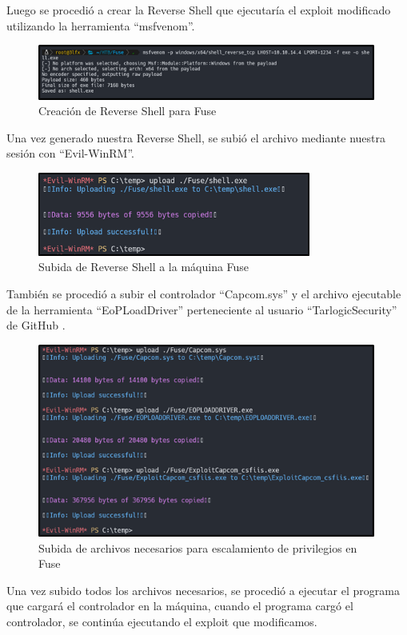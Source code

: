 Luego se procedió a crear la Reverse Shell que ejecutaría el exploit modificado utilizando la herramienta “msfvenom”.
\begin{figure}[H]
    \centering
    \includegraphics[width=0.99\textwidth]{imagenes/revshfuse.png}
    \caption{Creación de Reverse Shell para Fuse}
\end{figure}
Una vez generado nuestra Reverse Shell, se subió el archivo mediante nuestra sesión con “Evil-WinRM”.
\begin{figure}[H]
    \centering
    \includegraphics[width=0.8\textwidth]{imagenes/subshfuse.png}
    \caption{Subida de Reverse Shell a la máquina Fuse}
\end{figure}
También se procedió a subir el controlador “Capcom.sys” y el archivo ejecutable de la herramienta “EoPLoadDriver” perteneciente al usuario “TarlogicSecurity” de GitHub \cite{loaddriver}.
\begin{figure}[H]
    \centering
    \includegraphics[width=0.99\textwidth]{imagenes/subnecfuse.png}
    \caption{Subida de archivos necesarios para escalamiento de privilegios en Fuse}
\end{figure}
Una vez subido todos los archivos necesarios, se procedió a ejecutar el programa que cargará el controlador en la máquina, cuando el programa cargó el controlador, se continúa ejecutando el exploit que modificamos.
